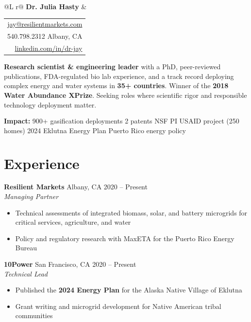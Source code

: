 \documentclass[10pt,letterpaper]{article}
\begin{document}
\noindent
\begin{tabularx}{\textwidth}{@{}L r@{}}
  {\LARGE\bfseries Dr. Julia Hasty} &
  \begin{tabular}[t]{@{}r@{}}
    \href{mailto:jay@resilientmarkets.com}{jay@resilientmarkets.com}\\
    540.798.2312 \textbullet{} Albany, CA\\
    \href{https://www.linkedin.com/in/dr-jay/}{linkedin.com/in/dr-jay}
  \end{tabular}
\end{tabularx}

\vspace{6pt}
\noindent\textbf{Research scientist \& engineering leader} with a PhD, peer-reviewed publications, FDA-regulated bio lab experience, and a track record deploying complex energy and water systems in \textbf{35+ countries}. Winner of the \textbf{2018 Water Abundance XPrize}. Seeking roles where scientific rigor and responsible technology deployment matter.

\vspace{4pt}
\noindent\textbf{Impact:} 900+ gasification deployments \textbullet{} 2 patents \textbullet{} NSF PI \textbullet{} USAID project (250 homes) \textbullet{} 2024 Eklutna Energy Plan \textbullet{} Puerto Rico energy policy

\section{Experience}

\noindent\textbf{Resilient Markets} \hfill Albany, CA \textbar{} 2020 -- Present\\
\textit{Managing Partner}
\begin{itemize}[nosep, leftmargin=1.2em, topsep=2pt]
  \item Technical assessments of integrated biomass, solar, and battery microgrids for critical services, agriculture, and water
  \item Policy and regulatory research with MaxETA for the Puerto Rico Energy Bureau
\end{itemize}

\noindent\textbf{10Power} \hfill San Francisco, CA \textbar{} 2020 -- Present\\
\textit{Technical Lead}
\begin{itemize}[nosep, leftmargin=1.2em, topsep=2pt]
  \item Published the \textbf{2024 Energy Plan} for the Alaska Native Village of Eklutna
  \item Grant writing and microgrid development for Native American tribal communities
\end{itemize}
\end{document}
